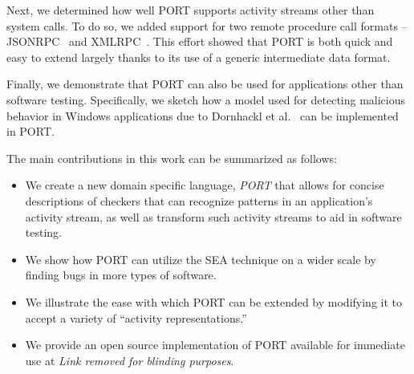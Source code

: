 Next, we
determined how well PORT
supports activity streams
other than system calls.
To do so, we 
added support for two remote procedure call formats --
JSONRPC~\cite{jsonspec} and XMLRPC~\cite{xmlspec}.
This effort
showed that PORT is both quick and easy to extend largely thanks to its
use of a generic intermediate data format.

Finally, we demonstrate that PORT can also be used for applications other than software testing.
Specifically, we sketch how a model used for
detecting malicious behavior in Windows applications due to Dornhackl et al.~\cite{Dornhackl2014} can be implemented in PORT.


The main contributions in this work can be summarized as follows:

\begin{itemize}

\item We create a new domain specific language, {\em PORT}
  that allows for concise descriptions of checkers that can recognize patterns in
  an application's activity stream, as well as transform such activity streams to aid in software testing.

\item We show how PORT can utilize the SEA technique on a wider scale by finding bugs in more types of software.

\item We illustrate the ease with which PORT can be extended by modifying
  it to accept a variety of ``activity representations.''
  
\item We provide an open source implementation of PORT available for immediate use
at \textit{Link removed for blinding purposes}.

\end{itemize}


